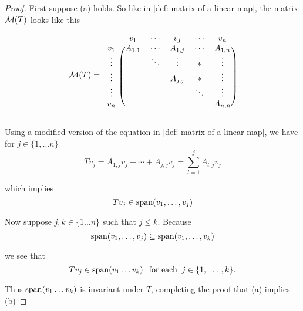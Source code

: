 \begin{proof}
  First suppose (a) holds. So like in \ref{def: matrix of a linear map}, the matrix $\mathcal{M}(T)$ looks like this

  \begin{minipage}{\linewidth}
  \begin{equation}
  \mathcal{M} (T) =
  \begin{blockarray}{cccccc}
    & v_1     & \cdots & v_j      & \cdots & v_n     \\
    \begin{block}{c(ccccc)}
      v_1    & A_{1,1} & \cdots & A_{1,j}  & \cdots & A_{1,n} \\
      \vdots &         & \ddots & \vdots   &   *    & \vdots  \\
      \vdots &         &        & A_{j,j}  &   *    & \vdots  \\
      \vdots &         &        &          & \ddots & \vdots  \\
      v_n    &         &        &          &        & A_{n,n} \\
    \end{block}
  \end{blockarray}
  \end{equation}
  \end{minipage}


  Using a modified version of the equation in \ref{def: matrix of a linear map}, we have for $j\in \{1, \ldots n \}$
  \begin{equation}
    T v_j = A_{1,j} v_j + \cdots + A_{j,j} v_j = \sum_{l=1}^{j} A_{l,j} v_j
  \end{equation}

  which implies
  \begin{equation}
    T v_j \in \operatorname{span} (v_1, \ldots, v_j)
  \end{equation}

  Now suppose $j, k \in \{1 \ldots n \}$ such that $j \leq  k.$ Because
  \begin{equation}
    \operatorname{span} (v_1, \ldots, v_j) \subseteq \operatorname{span} (v_1, \ldots, v_k)
  \end{equation}

  we see that
  \begin{equation}
    T v_j \in \operatorname{span} (v_1 \ldots v_k) \;\;\, \text{for each}\;\; j \in \{1, {\, \ldots \,\,}, k\}.
  \end{equation}

  Thus $\operatorname{span} (v_1 \ldots v_k)$ is invariant under $T$, completing the proof that (a) implies (b)


\end{proof}
